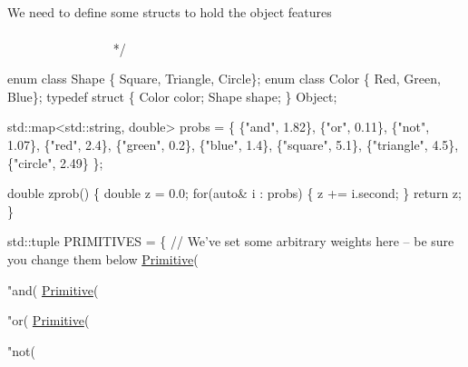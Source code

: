\subparagraph*{}


\begin{DoxyCode}
    We need to define some structs to hold the \textcolor{keywordtype}{object} features
   ~~~~~~~~~~~~~~~~~~~~~~~~~~~~~~~~~~~~~~~~~~~~~~~~~~~~~~~~~~~~~~~~~~~~~~~~~~~~~~~~~~~~~~~~ */

\textcolor{keyword}{enum    class}  Shape  \{ Square, Triangle, Circle\};
\textcolor{keyword}{enum    class}  Color  \{ Red, Green, Blue\};
\textcolor{keyword}{typedef} \textcolor{keyword}{struct }\{ Color color; Shape shape; \} Object;




std::map<std::string, double> probs = \{
                                        \{\textcolor{stringliteral}{"and"}, 1.82\}, \{\textcolor{stringliteral}{"or"}, 0.11\}, \{\textcolor{stringliteral}{"not"}, 1.07\},
                                        \{\textcolor{stringliteral}{"red"}, 2.4\},  \{\textcolor{stringliteral}{"green"}, 0.2\}, \{\textcolor{stringliteral}{"blue"}, 1.4\},
                                        \{\textcolor{stringliteral}{"square"}, 5.1\}, \{\textcolor{stringliteral}{"triangle"}, 4.5\}, \{\textcolor{stringliteral}{"circle"}, 2.49\}
                                       \};

\textcolor{keywordtype}{double} zprob() \{
    \textcolor{keywordtype}{double} z = 0.0;
    \textcolor{keywordflow}{for}(\textcolor{keyword}{auto}& i : probs) \{
        z += i.second;
    \}
    \textcolor{keywordflow}{return} z;
\}

std::tuple PRIMITIVES = \{
    \textcolor{comment}{// We've set some arbitrary weights here -- be sure you change them below}
    \hyperlink{struct_primitive}{Primitive}(\textcolor{stringliteral}{"and(%
    \hyperlink{struct_primitive}{Primitive}(\textcolor{stringliteral}{"or(%
    \hyperlink{struct_primitive}{Primitive}(\textcolor{stringliteral}{"not(%

}}}
\end{DoxyCode}
